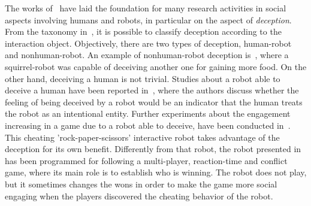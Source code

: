 The works of~\cite{de1980interpersonal, wagner2008analyzing, wagner2011acting, wagner2009robot} have laid the foundation for many research activities in social aspects involving humans and robots, in particular on the aspect of \textit{deception}. From the taxonomy in~\cite{shim2013taxonomy}, it is possible to classify deception according to the interaction object. Objectively, there are two types of deception, human-robot and nonhuman-robot.
An example of nonhuman-robot deception is~\cite{shim2012biologically}, where a squirrel-robot was capable of deceiving another one for gaining more food.
On the other hand, deceiving a human is not trivial. Studies about a robot able to deceive a human have been reported in~\cite{terada2010can}, where the authors discuss whether the feeling of being deceived by a robot would be an indicator that the human treats the robot as an intentional entity. 
Further experiments about the engagement increasing in a game due to a robot able to deceive, have been conducted in~\cite{short2010no}. This cheating 'rock-paper-scissors' interactive robot takes advantage of the deception for its own benefit.
Differently from that robot, the robot presented in~\cite{vazquez2011deceptive} has been programmed for following a multi-player, reaction-time and conflict game, where its main role is to establish who is winning. The robot does not play, but it sometimes changes the wons in order to make the game more social engaging when the players discovered the cheating behavior of the robot. %

